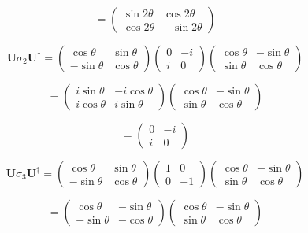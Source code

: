 \documentclass[12pt]{article}
\begin{document}
\[
    =
    \begin{pmatrix}
        \sin 2\theta  & \cos 2 \theta \\
        \cos 2 \theta & -\sin 2\theta
    \end{pmatrix}
\]

\[
    \mathbf{U}\sigma_2\mathbf{U^\dagger} =
    \begin{pmatrix}
        \cos \theta  & \sin \theta \\
        -\sin \theta & \cos \theta
    \end{pmatrix}
    \begin{pmatrix}
        0 & -i \\
        i & 0
    \end{pmatrix}
    \begin{pmatrix}
        \cos \theta & -\sin \theta \\
        \sin \theta & \cos \theta
    \end{pmatrix}
\]

\[
    =
    \begin{pmatrix}
        i\sin \theta & -i\cos \theta \\
        i\cos \theta & i\sin \theta
    \end{pmatrix}
    \begin{pmatrix}
        \cos \theta & -\sin \theta \\
        \sin \theta & \cos \theta
    \end{pmatrix}
\]

\[
    =
    \begin{pmatrix}
        0 & -i \\
        i & 0
    \end{pmatrix}
\]

\[
    \mathbf{U}\sigma_3\mathbf{U^\dagger} =
    \begin{pmatrix}
        \cos \theta  & \sin \theta \\
        -\sin \theta & \cos \theta
    \end{pmatrix}
    \begin{pmatrix}
        1 & 0  \\
        0 & -1
    \end{pmatrix}
    \begin{pmatrix}
        \cos \theta & -\sin \theta \\
        \sin \theta & \cos \theta
    \end{pmatrix}
\]

\[
    =
    \begin{pmatrix}
        \cos \theta  & -\sin \theta \\
        -\sin \theta & -\cos \theta
    \end{pmatrix}
    \begin{pmatrix}
        \cos \theta & -\sin \theta \\
        \sin \theta & \cos \theta
    \end{pmatrix}
\]
\end{document}
